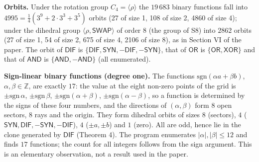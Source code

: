 \documentclass[10pt,a4paper]{article}
\begin{document}
\textbf{Orbits.} Under the rotation group $C_4=\langle\rho\rangle$ the $19\,683$ binary functions fall into $4995=\tfrac14(3^9+2\cdot3^3+3^5)$ orbits (27 of size 1, 108 of size 2, 4860 of size 4); under the dihedral group $\langle\rho,\mathsf{SWAP}\rangle$ of order $8$ (the group of S8) into $2862$ orbits (27 of size 1, 54 of size 2, 675 of size 4, 2106 of size 8), as in Section VI of the paper. The orbit of $\mathsf{DIF}$ is $\{\mathsf{DIF},\mathsf{SYN},-\mathsf{DIF},-\mathsf{SYN}\}$, that of $\mathsf{OR}$ is $\{\mathsf{OR},\mathsf{XOR}\}$ and that of $\mathsf{AND}$ is $\{\mathsf{AND},-\mathsf{AND}\}$ (all enumerated).

\textbf{Sign-linear binary functions (degree one).} The functions $\mathrm{sgn}(\alpha a+\beta b)$, $\alpha,\beta\in\mathbb Z$, are exactly $17$: the value at the eight non-zero points of the grid is $\pm\mathrm{sgn}\,\alpha$, $\pm\mathrm{sgn}\,\beta$, $\pm\mathrm{sgn}(\alpha+\beta)$, $\pm\mathrm{sgn}(\alpha-\beta)$, so a function is determined by the signs of these four numbers, and the directions of $(\alpha,\beta)$ form $8$ open sectors, $8$ rays and the origin. They form dihedral orbits of sizes $8$ (sectors), $4$ ($\mathsf{SYN},\mathsf{DIF},-\mathsf{SYN},-\mathsf{DIF}$), $4$ ($\pm a,\pm b$) and $1$ (zero). All are odd, hence lie in the clone generated by $\mathsf{DIF}$ (Theorem 4). The program enumerates $|\alpha|,|\beta|\le12$ and finds $17$ functions; the count for all integers follows from the sign argument. This is an elementary observation, not a result used in the paper.
\end{document}

